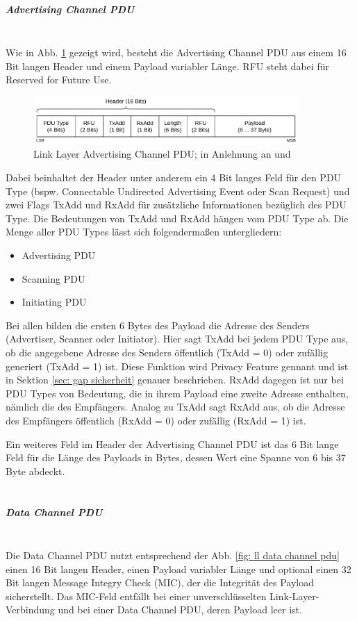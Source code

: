 \subparagraph{Advertising Channel PDU} \mbox{} \vspace{0.2cm} \\
Wie in Abb. \ref{fig: ll adv channel pdu} gezeigt wird, besteht die Advertising Channel PDU aus einem 16 Bit langen Header und einem Payload variabler Länge. RFU steht dabei für Reserved for Future Use.

\begin{figure}[H]
    \centering
    \includegraphics[width=0.9\textwidth]{graphics/link_layer_packetformat_pdu_adv.pdf}
    \caption[Link Layer Advertising Channel PDU]{Link Layer Advertising Channel PDU; in Anlehnung an \cite{BtSpec_fig_2201} und \cite{BtSpec_fig_2202}}
    \label{fig: ll adv channel pdu}
\end{figure}

Dabei beinhaltet der Header unter anderem ein 4 Bit langes Feld für den PDU Type (bspw. Connectable Undirected Advertising Event oder Scan Request) und zwei Flags TxAdd und RxAdd für zusätzliche Informationen bezüglich des PDU Type. Die Bedeutungen von TxAdd und RxAdd hängen vom PDU Type ab. Die Menge aller PDU Types lässt sich folgendermaßen untergliedern:
\begin{itemize}
    \item Advertising PDU
    \item Scanning PDU
    \item Initiating PDU
\end{itemize}
Bei allen bilden die ersten 6 Bytes des Payload die Adresse des Senders (Advertiser, Scanner oder Initiator). Hier sagt TxAdd bei jedem PDU Type aus, ob die angegebene Adresse des Senders öffentlich (TxAdd = 0) oder zufällig generiert (TxAdd = 1) ist. Diese Funktion wird Privacy Feature gennant und ist in Sektion \ref{sec: gap sicherheit} genauer beschrieben. RxAdd dagegen ist nur bei PDU Types von Bedeutung, die in ihrem Payload eine zweite Adresse enthalten, nämlich die des Empfängers. Analog zu TxAdd sagt RxAdd aus, ob die Adresse des Empfängers öffentlich (RxAdd = 0) oder zufällig (RxAdd = 1) ist.

Ein weiteres Feld im Header der Advertising Channel PDU ist das 6 Bit lange Feld für die Länge des Payloads in Bytes, dessen Wert eine Spanne von 6 bis 37 Byte abdeckt. \cite{BtSpec4.0_2201-2208}
\\\\
\subparagraph{Data Channel PDU} \mbox{} \vspace{0.2cm} \\
Die Data Channel PDU nutzt entsprechend der Abb. \ref{fig: ll data channel pdu} einen 16 Bit langen Header, einen Payload variabler Länge und optional einen 32 Bit langen Message Integry Check (MIC), der die Integrität des Payload sicherstellt. Das MIC-Feld entfällt bei einer unverschlüsselten Link-Layer-Verbindung und bei einer Data Channel PDU, deren Payload leer ist.

